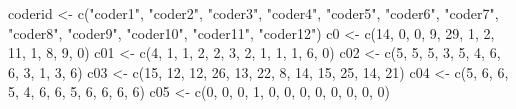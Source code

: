 \documentclass[
]{book}
\newenvironment{Shaded}{\begin{snugshade}}{\end{snugshade}}
\newcommand{\DecValTok}[1]{\textcolor[rgb]{0.00,0.00,0.81}{#1}}
\newcommand{\FunctionTok}[1]{\textcolor[rgb]{0.00,0.00,0.00}{#1}}
\newcommand{\NormalTok}[1]{#1}
\newcommand{\OtherTok}[1]{\textcolor[rgb]{0.56,0.35,0.01}{#1}}
\newcommand{\StringTok}[1]{\textcolor[rgb]{0.31,0.60,0.02}{#1}}
\begin{document}
\begin{Shaded}
\begin{Highlighting}[]
\NormalTok{coderid }\OtherTok{\textless{}{-}} \FunctionTok{c}\NormalTok{(}\StringTok{"coder1"}\NormalTok{, }\StringTok{"coder2"}\NormalTok{, }\StringTok{"coder3"}\NormalTok{, }\StringTok{"coder4"}\NormalTok{, }\StringTok{"coder5"}\NormalTok{,}
    \StringTok{"coder6"}\NormalTok{, }\StringTok{"coder7"}\NormalTok{, }\StringTok{"coder8"}\NormalTok{, }\StringTok{"coder9"}\NormalTok{, }\StringTok{"coder10"}\NormalTok{, }\StringTok{"coder11"}\NormalTok{,}
    \StringTok{"coder12"}\NormalTok{)}
\NormalTok{c0 }\OtherTok{\textless{}{-}} \FunctionTok{c}\NormalTok{(}\DecValTok{14}\NormalTok{, }\DecValTok{0}\NormalTok{, }\DecValTok{0}\NormalTok{, }\DecValTok{9}\NormalTok{, }\DecValTok{29}\NormalTok{, }\DecValTok{1}\NormalTok{, }\DecValTok{2}\NormalTok{, }\DecValTok{11}\NormalTok{, }\DecValTok{1}\NormalTok{, }\DecValTok{8}\NormalTok{, }\DecValTok{9}\NormalTok{, }\DecValTok{0}\NormalTok{)}
\NormalTok{c01 }\OtherTok{\textless{}{-}} \FunctionTok{c}\NormalTok{(}\DecValTok{4}\NormalTok{, }\DecValTok{1}\NormalTok{, }\DecValTok{1}\NormalTok{, }\DecValTok{2}\NormalTok{, }\DecValTok{2}\NormalTok{, }\DecValTok{3}\NormalTok{, }\DecValTok{2}\NormalTok{, }\DecValTok{1}\NormalTok{, }\DecValTok{1}\NormalTok{, }\DecValTok{1}\NormalTok{, }\DecValTok{6}\NormalTok{, }\DecValTok{0}\NormalTok{)}
\NormalTok{c02 }\OtherTok{\textless{}{-}} \FunctionTok{c}\NormalTok{(}\DecValTok{5}\NormalTok{, }\DecValTok{5}\NormalTok{, }\DecValTok{5}\NormalTok{, }\DecValTok{3}\NormalTok{, }\DecValTok{5}\NormalTok{, }\DecValTok{4}\NormalTok{, }\DecValTok{6}\NormalTok{, }\DecValTok{6}\NormalTok{, }\DecValTok{3}\NormalTok{, }\DecValTok{1}\NormalTok{, }\DecValTok{3}\NormalTok{, }\DecValTok{6}\NormalTok{)}
\NormalTok{c03 }\OtherTok{\textless{}{-}} \FunctionTok{c}\NormalTok{(}\DecValTok{15}\NormalTok{, }\DecValTok{12}\NormalTok{, }\DecValTok{12}\NormalTok{, }\DecValTok{26}\NormalTok{, }\DecValTok{13}\NormalTok{, }\DecValTok{22}\NormalTok{, }\DecValTok{8}\NormalTok{, }\DecValTok{14}\NormalTok{, }\DecValTok{15}\NormalTok{, }\DecValTok{25}\NormalTok{, }\DecValTok{14}\NormalTok{, }\DecValTok{21}\NormalTok{)}
\NormalTok{c04 }\OtherTok{\textless{}{-}} \FunctionTok{c}\NormalTok{(}\DecValTok{5}\NormalTok{, }\DecValTok{6}\NormalTok{, }\DecValTok{6}\NormalTok{, }\DecValTok{5}\NormalTok{, }\DecValTok{4}\NormalTok{, }\DecValTok{6}\NormalTok{, }\DecValTok{6}\NormalTok{, }\DecValTok{5}\NormalTok{, }\DecValTok{6}\NormalTok{, }\DecValTok{6}\NormalTok{, }\DecValTok{6}\NormalTok{, }\DecValTok{6}\NormalTok{)}
\NormalTok{c05 }\OtherTok{\textless{}{-}} \FunctionTok{c}\NormalTok{(}\DecValTok{0}\NormalTok{, }\DecValTok{0}\NormalTok{, }\DecValTok{0}\NormalTok{, }\DecValTok{1}\NormalTok{, }\DecValTok{0}\NormalTok{, }\DecValTok{0}\NormalTok{, }\DecValTok{0}\NormalTok{, }\DecValTok{0}\NormalTok{, }\DecValTok{0}\NormalTok{, }\DecValTok{0}\NormalTok{, }\DecValTok{0}\NormalTok{, }\DecValTok{0}\NormalTok{)}

\end{Highlighting}
\end{Shaded}
\end{document}
